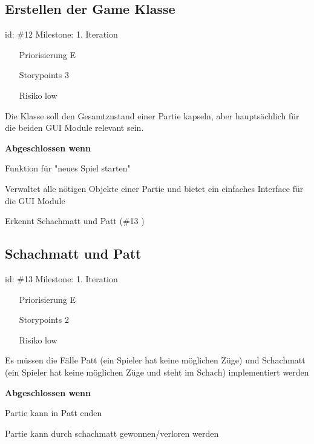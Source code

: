 \subsection*{Erstellen der Game Klasse}
id: \#12 Milestone: 1. Iteration\\

\begin{itemize}
\item[Priorisierung] E
\item[Storypoints] 3
\item[Risiko] low
\end{itemize}

Die  Klasse soll den Gesamtzustand einer Partie kapseln, aber hauptsächlich für die beiden GUI Module relevant sein.

\textbf{Abgeschlossen wenn}
\begin{todolist}
    \item[\done]  Funktion für "neues Spiel starten"
  \item[\done]  Verwaltet alle nötigen Objekte einer Partie und bietet ein einfaches Interface für die GUI Module
  \item[\done]  Erkennt Schachmatt und Patt (\#13 )

\end{todolist}


\subsection*{Schachmatt und Patt}
id: \#13 Milestone: 1. Iteration\\

\begin{itemize}
\item[Priorisierung] E
\item[Storypoints] 2
\item[Risiko] low
\end{itemize}

Es müssen die Fälle Patt (ein Spieler hat keine möglichen Züge) und Schachmatt (ein Spieler hat keine möglichen Züge und steht im Schach) implementiert werden

\textbf{Abgeschlossen wenn}
\begin{todolist}
    \item[\done]  Partie kann in Patt enden
  \item[\done]  Partie kann durch schachmatt gewonnen/verloren werden

\end{todolist}


